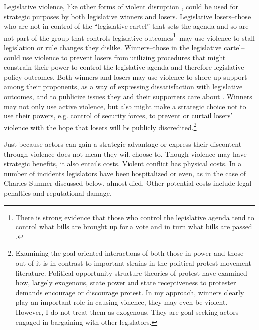 \documentclass[a4paper]{article}\usepackage[]{graphicx}\usepackage[]{color}
\begin{document}
Legislative violence, like other forms of violent disruption \citep[]{Beaulieu2008,BeaulieuForthcoming,wilkinson2006}, could be used for strategic purposes by both legislative winners and losers. Legislative losers--those who are not in control of the ``legislative cartel''  that sets the agenda \citep{cox2007} and so are not part of the group that controls legislative outcomes\footnote{There is strong evidence that those who control the legislative agenda tend to control what bills are brought up for a vote and in turn what bills are passed \citep[93]{tsebelis2002}.}--may use violence to stall legislation or rule changes they dislike. Winners--those in the legislative cartel--could use violence to prevent losers from utilizing procedures that might constrain their power to control the legislative agenda and therefore legislative policy outcomes. Both winners and losers may use violence to shore up support among their proponents, as a way of expressing dissatisfaction with legislative outcomes, and to publicize issues they and their supporters care about \citep{Spary2013}. Winners may not only use active violence, but also might make a strategic choice not to use their powers, e.g. control of security forces, to prevent or curtail losers' violence with the hope that losers will be publicly discredited.\footnote{Examining the goal-oriented interactions of both those in power and those out of it is in contrast to important strains in the political protest movement literature. Political opportunity structure theories of protest have examined how, largely exogenous, state power \citep{skocpol1979} and state receptiveness to protester demands \citep{mcadam1982,tarrow1989} encourage or discourage protest. In my approach, winners clearly play an important role in causing violence, they may even be violent. However, I do not treat them as exogenous. They are goal-seeking actors engaged in bargaining with other legislators.}

Just because actors can gain a strategic advantage or express their discontent through violence does not mean they will choose to. Though violence may have strategic benefits, it also entails costs. Violent conflict has physical costs. In a number of incidents legislators have been hospitalized or even, as in the case of Charles Sumner discussed below, almost died. Other potential costs include legal penalties and reputational damage.
\end{document}
